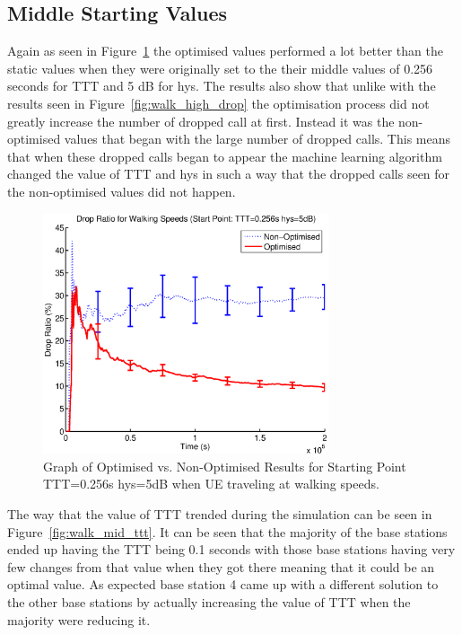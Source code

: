 \subsection{Middle Starting Values}
Again as seen in Figure~\ref{fig:walk_mid_drop} the optimised values performed a lot better than the static values when they were originally set to the their middle values of 0.256 seconds for TTT and 5 dB for hys. The results also show that unlike with the results seen in Figure~\ref{fig:walk_high_drop} the optimisation process did not greatly increase the number of dropped call at first. Instead it was the non-optimised values that began with the large number of dropped calls. This means that when these dropped calls began to appear the machine learning algorithm changed the value of TTT and hys in such a way that the dropped calls seen for the non-optimised values did not happen.
\begin{figure}[H]
  \begin{center}
    	  \includegraphics[width=0.75\textwidth]{figures/walking_figures/walkmid.eps}
    \end{center}
    \caption{Graph of Optimised vs. Non-Optimised Results for Starting Point TTT=0.256s hys=5dB when UE traveling at walking speeds.}
    \label{fig:walk_mid_drop}
\end{figure}
The way that the value of TTT trended during the simulation can be seen in Figure~\ref{fig:walk_mid_ttt}. It can be seen that the majority of the base stations ended up having the TTT being 0.1 seconds with those base stations having very few changes from that value when they got there meaning that it could be an optimal value. As expected base station 4 came up with a different solution to the other base stations by actually increasing the value of TTT when the majority were reducing it.

